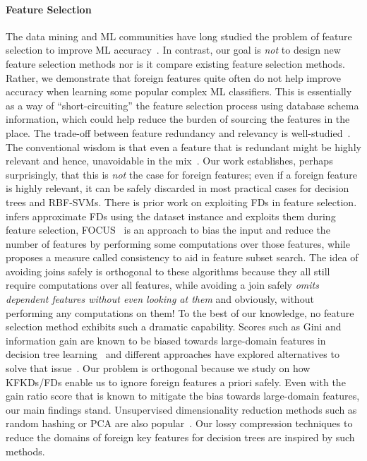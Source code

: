 \documentclass{vldb}
\begin{document}
\paragraph*{Feature Selection}
The data mining and ML communities have long studied the problem of feature selection to improve ML accuracy~\cite{guyonbook,hastie}.
In contrast, our goal is \textit{not} to design new feature selection methods nor is it compare existing feature selection methods. 
Rather, we demonstrate that foreign features quite often do not help improve accuracy when learning some popular complex ML classifiers. 
This is essentially as a way of ``short-circuiting'' the feature selection process using database schema information, which could help reduce
the burden of sourcing the features in the place.
The trade-off between feature redundancy and relevancy is well-studied~\cite{guyonbook,leiyu,daphnekoller}. The conventional wisdom is that even a feature that is 
redundant might be highly relevant and hence, unavoidable in the mix~\cite{guyonbook}. Our work establishes, perhaps surprisingly, that this is \textit{not} the case 
for foreign features; even if a foreign feature is highly relevant, it can be safely discarded in most practical cases for decision trees and RBF-SVMs.
There is prior work on exploiting FDs in feature selection.
\cite{approxfds} infers approximate FDs using the dataset instance and exploits them during feature selection, FOCUS~\cite{focus} is an 
approach to bias the input and reduce the number of features by performing some computations over those features, while~\cite{consistencyfs} proposes
a measure called consistency to aid in feature subset search.
The idea of avoiding joins safely is orthogonal to these algorithms because they all still require computations over all features, while avoiding a join safely 
\textit{omits dependent features without even looking at them} and obviously, without performing any computations on them!
To the best of our knowledge, no feature selection method exhibits such a dramatic capability.
Scores such as Gini and information gain are known to be biased towards large-domain features in decision tree learning~\cite{dtreebias1} and different approaches 
have explored alternatives to solve that issue~\cite{dtreebias2}. Our problem is orthogonal because we study on how KFKDs/FDs enable us to ignore foreign features 
a priori safely. Even with the gain ratio score that is known to mitigate the bias towards large-domain features, our main findings stand.
Unsupervised dimensionality reduction methods such as random hashing or PCA are also popular~\cite{hastie,mitchellbook}. Our lossy compression techniques to 
reduce the domains of foreign key features for decision trees are inspired by such methods.
\end{document}
